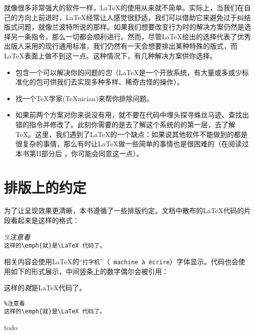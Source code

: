 就像很多非常强大的软件一样，\LaTeX 的使用从来就不简单。实际上，当我们在自己的方向上前进时，\LaTeX 经常让人感觉很舒适，我们可以借助它来避免过于纠结版式问题，就像兰波特所说的那样。如果我们想要改变行为时的解决方案仍然是选择另一条指令，那么一切都会顺利进行。然而，尽管\LaTeX 给出的选择代表了优秀出版人采用的现行通用标准，我们仍然有一天会想要排出某种特殊的版式，而\LaTeX 表面上做不到这一点。这种情况下，有几种解决方案供你选择。
\begin{itemize}
    \item 包含一个可以解决你的问题的\emph{包}（\LaTeX 是一个开放系统，有大量或多或少标准化的包可供我们去实现多种多样、稀奇古怪的操作）。
    \item 找一个\TeX 学家(\TeX nician)来帮你排除问题。
    \item 如果前两个方案对你来说没有用，就不要在代码中埋头探寻蛛丝马迹、查找出错的指令并修改了。此刻你需要的是去了解这个系统的的第一层，去了解\TeX 。这里，我们遇到了\LaTeX 的一个缺点：如果说其他软件不能做到的都是很复杂的事情，那么有时让\LaTeX 做一些简单的事情也是很困难的（在阅读过本书第II部分后%
    ，你可能会同意这一点）。
\end{itemize}

\section*{排版上的约定}

为了让呈现效果更清晰，本书遵循了一些排版约定。文档中散布的\LaTeX 代码的片段看起来是这样的格式：

\begin{dmd}
\textsl{\%注意看}\\
\verb+这样的\emph{就}是\LaTeX 代码了。+
\end{dmd}

相关内容会使用\LaTeX 的“\texttt{打字机}”（\texttt{ machine à écrire}）字体显示。代码也会使用如下的形式展示，中间竖条上的数字偶尔会被引用：%

\begin{codelist}[0.1]{
    这样的\emph{就}是\LaTeX 代码了。
}\begin{verbatim}
%注意看
这样的\emph{就}是\LaTeX 代码了。
\end{verbatim}
\end{codelist}

\begin{exclamation}
todo
\end{exclamation}
